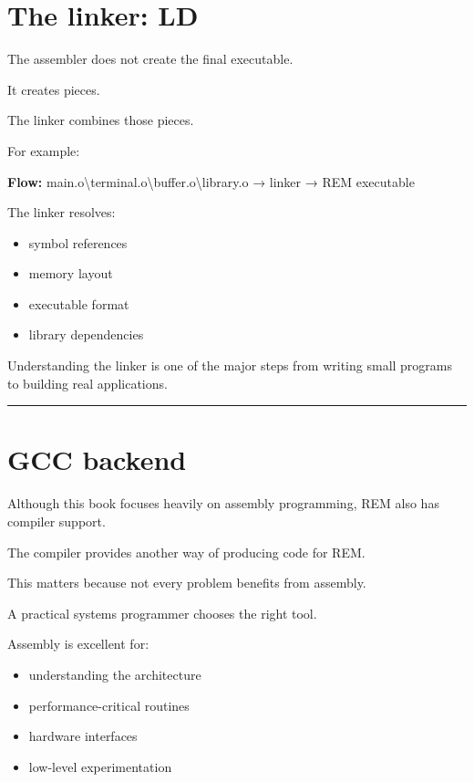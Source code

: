 \documentclass[
  oneside,
  openany]{book}
\providecommand{\tightlist}{%
  \setlength{\itemsep}{0pt}\setlength{\parskip}{0pt}}
\begin{document}
\hypertarget{the-linker-ld}{%
\section{The linker: LD}\label{the-linker-ld}}

The assembler does not create the final executable.

It creates pieces.

The linker combines those pieces.

For example:

\textbf{Flow:}
main.o\textbackslash terminal.o\textbackslash buffer.o\textbackslash library.o
→ linker → REM executable

The linker resolves:

\begin{itemize}
\tightlist
\item
  symbol references
\item
  memory layout
\item
  executable format
\item
  library dependencies
\end{itemize}

Understanding the linker is one of the major steps from writing small
programs to building real applications.

\begin{center}\rule{0.5\linewidth}{0.5pt}\end{center}

\hypertarget{gcc-backend}{%
\section{GCC backend}\label{gcc-backend}}

Although this book focuses heavily on assembly programming, REM also has
compiler support.

The compiler provides another way of producing code for REM.

This matters because not every problem benefits from assembly.

A practical systems programmer chooses the right tool.

Assembly is excellent for:

\begin{itemize}
\tightlist
\item
  understanding the architecture
\item
  performance-critical routines
\item
  hardware interfaces
\item
  low-level experimentation
\end{itemize}
\end{document}
